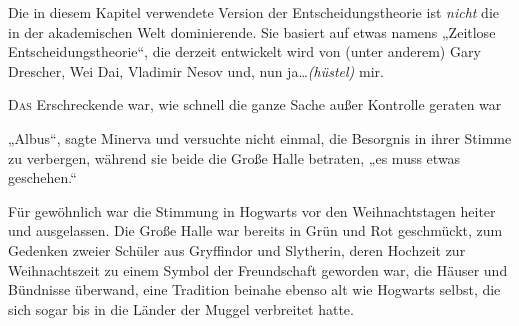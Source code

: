 
\begin{chapterOpeningAuthorNote}
%
Die in diesem Kapitel verwendete Version der Entscheidungstheorie ist \emph{nicht} die in der akademischen Welt dominierende. Sie basiert auf etwas namens „Zeitlose Entscheidungstheorie“, die derzeit entwickelt wird von (unter anderem) Gary Drescher, Wei Dai, Vladimir Nesov und, nun ja…\emph{(hüstel)} mir.
\end{chapterOpeningAuthorNote}

\lettrine{D}{as} Erschreckende war, wie schnell die ganze Sache außer Kontrolle geraten war

„Albus“, sagte Minerva und versuchte nicht einmal, die Besorgnis in ihrer Stimme zu verbergen, während sie beide die Große Halle betraten, „es muss etwas geschehen.“

Für gewöhnlich war die Stimmung in Hogwarts vor den Weihnachtstagen heiter und ausgelassen. Die Große Halle war bereits in Grün und Rot geschmückt, zum Gedenken zweier Schüler aus Gryffindor und Slytherin, deren Hochzeit zur Weihnachtszeit zu einem Symbol der Freundschaft geworden war, die Häuser und Bündnisse überwand, eine Tradition beinahe ebenso alt wie Hogwarts selbst, die sich sogar bis in die Länder der Muggel verbreitet hatte.%


